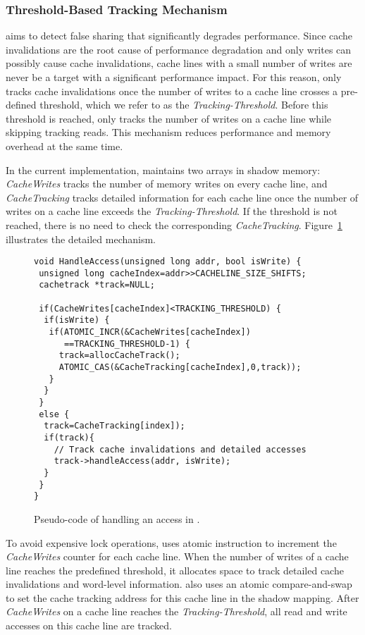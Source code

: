 \subsubsection{Threshold-Based Tracking Mechanism}
\label{sec:thresholdtracking}
\Predator{} aims to detect false sharing that significantly degrades performance. Since cache invalidations are the root cause of performance degradation and only writes 
can possibly cause cache invalidations, 
cache lines with a small number of writes are never be a target with a significant performance impact.
For this reason, \Predator{} only tracks cache invalidations
once the number of writes to a cache line crosses a
pre-defined threshold, which we refer to as the {\it Tracking-Threshold}. 
Before this threshold is reached, \Predator{} only tracks the number of writes on a cache line while skipping tracking reads. This mechanism reduces performance and memory overhead
at the same time.

In the current implementation, \Predator{} maintains two arrays in shadow memory: 
{\it CacheWrites} tracks the number of memory writes on every cache line, and
{\it CacheTracking} tracks detailed information 
for each cache line once the number of writes on a cache line exceeds the {\it Tracking-Threshold}. 
If the threshold is not reached, there is no need to check the corresponding {\it CacheTracking}. 
Figure~\ref{fig:algorithm} illustrates the detailed mechanism.

\begin{figure}[!t]
\begin{lstlisting}[style=tt]
void HandleAccess(unsigned long addr, bool isWrite) {
 unsigned long cacheIndex=addr>>CACHELINE_SIZE_SHIFTS;
 cachetrack *track=NULL;

 if(CacheWrites[cacheIndex]<TRACKING_THRESHOLD) {
  if(isWrite) {
   if(ATOMIC_INCR(&CacheWrites[cacheIndex]) 
      ==TRACKING_THRESHOLD-1) {
     track=allocCacheTrack();
     ATOMIC_CAS(&CacheTracking[cacheIndex],0,track));
   }
  } 
 }
 else {
  track=CacheTracking[index]);
  if(track){
    // Track cache invalidations and detailed accesses
    track->handleAccess(addr, isWrite);
  }
 }
}
\end{lstlisting}
\caption{Pseudo-code of handling an access in \Predator{}.\label{fig:algorithm}}
\end{figure}

To avoid expensive lock operations, \Predator{} uses atomic instruction to increment the {\it CacheWrites} counter for each cache line. 
When the number of writes of a cache line reaches the predefined threshold,
it allocates space to track detailed cache invalidations and word-level information. \Predator{} also 
uses an atomic compare-and-swap to set the cache tracking address for this cache line in the shadow mapping.
After {\it CacheWrites} on a cache line reaches the {\it Tracking-Threshold}, all read and write accesses on this cache line are tracked.



